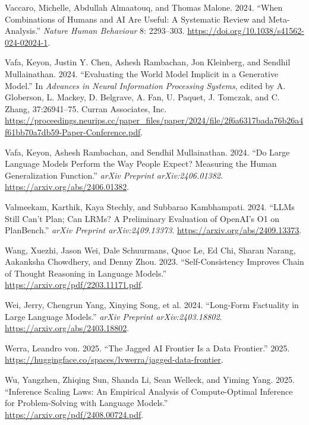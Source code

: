 \documentclass[
  letterpaper,
  DIV=11,
  numbers=noendperiod,
  oneside]{scrartcl}
\newlength{\cslhangindent}
\newenvironment{CSLReferences}[2] %
 {\begin{list}{}{%
  \setlength{\itemindent}{0pt}
  \setlength{\leftmargin}{0pt}
  \setlength{\parsep}{0pt}
  \ifodd #1
   \setlength{\leftmargin}{\cslhangindent}
   \setlength{\itemindent}{-1\cslhangindent}
  \fi
  \setlength{\itemsep}{#2\baselineskip}}}
 {\end{list}}
\begin{document}
\begin{CSLReferences}{1}{0}
Vaccaro, Michelle, Abdullah Almaatouq, and Thomas Malone. 2024. {``When
Combinations of Humans and AI Are Useful: A Systematic Review and
Meta-Analysis.''} \emph{Nature Human Behaviour} 8: 2293--303.
\url{https://doi.org/10.1038/s41562-024-02024-1}.

Vafa, Keyon, Justin Y. Chen, Ashesh Rambachan, Jon Kleinberg, and
Sendhil Mullainathan. 2024. {``Evaluating the World Model Implicit in a
Generative Model.''} In \emph{Advances in Neural Information Processing
Systems}, edited by A. Globerson, L. Mackey, D. Belgrave, A. Fan, U.
Paquet, J. Tomczak, and C. Zhang, 37:26941--75. Curran Associates, Inc.
\url{https://proceedings.neurips.cc/paper_files/paper/2024/file/2f6a6317bada76b26a4f61bb70a7db59-Paper-Conference.pdf}.

Vafa, Keyon, Ashesh Rambachan, and Sendhil Mullainathan. 2024. {``Do
Large Language Models Perform the Way People Expect? Measuring the Human
Generalization Function.''} \emph{arXiv Preprint arXiv:2406.01382}.
\url{https://arxiv.org/abs/2406.01382}.

Valmeekam, Karthik, Kaya Stechly, and Subbarao Kambhampati. 2024.
{``LLMs Still Can't Plan; Can LRMs? A Preliminary Evaluation of OpenAI's
O1 on PlanBench.''} \emph{arXiv Preprint arXiv:2409.13373}.
\url{https://arxiv.org/abs/2409.13373}.

Wang, Xuezhi, Jason Wei, Dale Schuurmans, Quoc Le, Ed Chi, Sharan
Narang, Aakanksha Chowdhery, and Denny Zhou. 2023. {``Self-Consistency
Improves Chain of Thought Reasoning in Language Models.''}
\url{https://arxiv.org/pdf/2203.11171.pdf}.

Wei, Jerry, Chengrun Yang, Xinying Song, et al. 2024. {``Long-Form
Factuality in Large Language Models.''} \emph{arXiv Preprint
arXiv:2403.18802}. \url{https://arxiv.org/abs/2403.18802}.

Werra, Leandro von. 2025. {``The Jagged AI Frontier Is a Data
Frontier.''} 2025.
\url{https://huggingface.co/spaces/lvwerra/jagged-data-frontier}.

Wu, Yangzhen, Zhiqing Sun, Shanda Li, Sean Welleck, and Yiming Yang.
2025. {``Inference Scaling Laws: An Empirical Analysis of
Compute-Optimal Inference for Problem-Solving with Language Models.''}
\url{https://arxiv.org/pdf/2408.00724.pdf}.


\end{CSLReferences}
\end{document}
